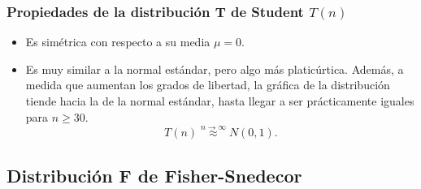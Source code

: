 \begin{frame}
\frametitle{Propiedades de la distribución T de Student $T(n)$}
\begin{itemize}
\item Es simétrica con respecto a su media $\mu=0$.
\item Es muy similar a la normal estándar, pero algo más platicúrtica. Además, a medida que aumentan los grados de libertad, la gráfica de la distribución tiende hacia la de la normal estándar, hasta llegar a ser prácticamente iguales para $n\geq 30$.
\[
T(n)\stackrel{n\rightarrow \infty}{\approx}N(0,1).
\]
\end{itemize}

\end{frame}


\subsection{Distribución F de Fisher-Snedecor}

